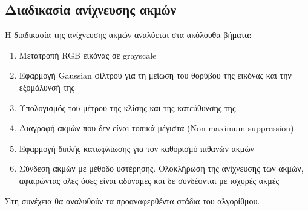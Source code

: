 \subsection{Διαδικασία ανίχνευσης ακμών}

Η διαδικασία της ανίχνευσης ακμών αναλύεται στα ακόλουθα βήματα:
\begin{enumerate}
   \item Μετατροπή RGB εικόνας σε grayscale
	\item Εφαρμογή Gaussian φίλτρου για τη μείωση του θορύβου της εικόνας και την εξομάλυνσή της
	\item Υπολογισμός του μέτρου της κλίσης και της κατεύθυνσης της
	\item Διαγραφή ακμών που δεν είναι τοπικά μέγιστα (Non-maximum suppression)
	\item Εφαρμογή διπλής κατωφλίωσης για τον καθορισμό πιθανών ακμών
	\item Σύνδεση ακμών με μέθοδο υστέρησης. Ολοκλήρωση της ανίχνευσης των ακμών, αφαιρώντας όλες όσες είναι αδύναμες και δε συνδέονται με ισχυρές ακμές \\
\end{enumerate}
Στη συνέχεια θα αναλυθούν τα προαναφερθέντα στάδια του αλγορίθμου.
\newpage
